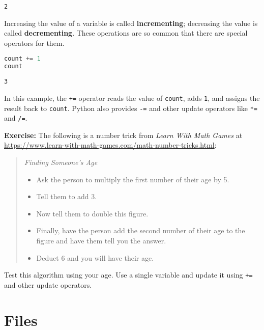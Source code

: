 \begin{lstlisting}[style=output]
2
\end{lstlisting}

Increasing the value of a variable is called \textbf{incrementing};
decreasing the value is called \textbf{decrementing}. These operations
are so common that there are special operators for them.

\begin{lstlisting}[language=Python,style=source]
count += 1
count
\end{lstlisting}

\begin{lstlisting}[style=output]
3
\end{lstlisting}

In this example, the \passthrough{\lstinline!+=!} operator reads the
value of \passthrough{\lstinline!count!}, adds
\passthrough{\lstinline!1!}, and assigns the result back to
\passthrough{\lstinline!count!}. Python also provides
\passthrough{\lstinline!-=!} and other update operators like
\passthrough{\lstinline!*=!} and \passthrough{\lstinline!/=!}.

\textbf{Exercise:} The following is a number trick from \emph{Learn With
Math Games} at
\url{https://www.learn-with-math-games.com/math-number-tricks.html}:

\begin{quote}
\emph{Finding Someone's Age}

\begin{itemize}
\item
  Ask the person to multiply the first number of their age by 5.
\item
  Tell them to add 3.
\item
  Now tell them to double this figure.
\item
  Finally, have the person add the second number of their age to the
  figure and have them tell you the answer.
\item
  Deduct 6 and you will have their age.
\end{itemize}
\end{quote}

Test this algorithm using your age. Use a single variable and update it
using \passthrough{\lstinline!+=!} and other update operators.

\hypertarget{files}{%
\section{Files}\label{files}}


